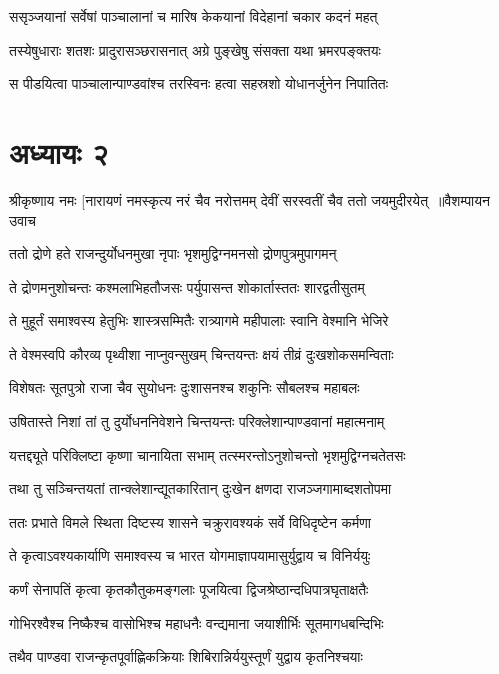 \twolineshloka
{ससृञ्जयानां सर्वेषां पाञ्चालानां च मारिष}
{केकयानां विदेहानां चकार कदनं महत्}


\twolineshloka
{तस्येषुधाराः शतशः प्रादुरासञ्छरासनात्}
{अग्रे पुङ्खेषु संसक्ता यथा भ्रमरपङ्क्तयः}


\twolineshloka
{स पीडयित्वा पाञ्चालान्पाण्डवांश्च तरस्विनः}
{हत्वा सहस्रशो योधानर्जुनेन निपातितः}


\chapter{अध्यायः २}
श्रीकृष्णाय नमः
\threelineshloka
{[नारायणं नमस्कृत्य नरं चैव नरोत्तमम्}
{देवीं सरस्वतीं चैव ततो जयमुदीरयेत् ॥वैशम्पायन उवाच}
{}


\twolineshloka
{ततो द्रोणे हते राजन्दुर्योधनमुखा नृपाः}
{भृशमुद्विग्नमनसो द्रोणपुत्रमुपागमन्}


\twolineshloka
{ते द्रोणमनुशोचन्तः कश्मलाभिहतौजसः}
{पर्युपासन्त शोकार्तास्ततः शारद्वतीसुतम्}


\twolineshloka
{ते मुहूर्तं समाश्वस्य हेतुभिः शास्त्रसम्मितैः}
{रात्र्यागमे महीपालाः स्वानि वेश्मानि भेजिरे}


\twolineshloka
{ते वेश्मस्वपि कौरव्य पृथ्वीशा नाप्नुवन्सुखम्}
{चिन्तयन्तः क्षयं तीव्रं दुःखशोकसमन्विताः}


\twolineshloka
{विशेषतः सूतपुत्रो राजा चैव सुयोधनः}
{दुःशासनश्च शकुनिः सौबलश्च महाबलः}


\twolineshloka
{उषितास्ते निशां तां तु दुर्योधननिवेशने}
{चिन्तयन्तः परिक्लेशान्पाण्डवानां महात्मनाम्}


\twolineshloka
{यत्तद्द्यूते परिक्लिष्टा कृष्णा चानायिता सभाम्}
{तत्स्मरन्तोऽनुशोचन्तो भृशमुद्विग्नचतेतसः}


\twolineshloka
{तथा तु सञ्चिन्तयतां तान्क्लेशान्द्यूतकारितान्}
{दुःखेन क्षणदा राजञ्जगामाब्दशतोपमा}


\twolineshloka
{ततः प्रभाते विमले स्थिता दिष्टस्य शासने}
{चक्रुरावश्यकं सर्वे विधिदृष्टेन कर्मणा}


\twolineshloka
{ते कृत्वाऽवश्यकार्याणि समाश्वस्य च भारत}
{योगमाज्ञापयामासुर्युद्वाय च विनिर्ययुः}


\twolineshloka
{कर्णं सेनापतिं कृत्वा कृतकौतुकमङ्गलाः}
{पूजयित्वा द्विजश्रेष्ठान्दधिपात्रघृताक्षतैः}


\twolineshloka
{गोभिरश्वैश्च निष्कैश्च वासोभिश्च महाधनैः}
{वन्द्यमाना जयाशीर्भिः सूतमागधबन्दिभिः}


\twolineshloka
{तथैव पाण्डवा राजन्कृतपूर्वाह्णिकक्रियाः}
{शिबिरान्निर्ययुस्तूर्णं युद्वाय कृतनिश्चयाः}


